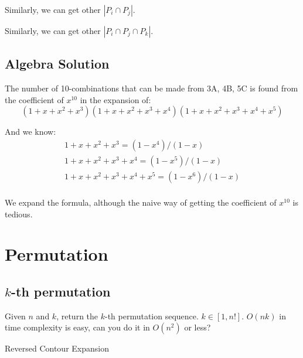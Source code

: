 Similarly, we can get other $|P_i \cap P_j|$.

Similarly, we can get other $|P_i \cap P_j \cap P_k|$.
\subsection{Algebra Solution}
The number of 10-combinations that can be made from 3A, 4B, 5C is found from the coefficient of $x^{10}$ in the expansion of:
$$
(1+x+x^2+x^3)(1+x+x^2+x^3+x^4)(1+x+x^2+x^3+x^4+x^5)
$$

And we know:
\begin{eqnarray*}
1+x+x^2+x^3         = (1-x^4)/(1-x)  \\
1+x+x^2+x^3+x^4     = (1-x^5)/(1-x)  \\
1+x+x^2+x^3+x^4+x^5 = (1-x^6)/(1-x)  \\
\end{eqnarray*}


We expand the formula, although the  naive way of getting the coefficient of $x^{10}$ is tedious. 

\section{Permutation}

\subsection{$k$-th permutation}
Given $n$ and $k$, return the $k$-th permutation sequence. $k\in [1, n!]$. $O(nk)$ in time complexity is easy, can you do it in $O(n^2)$ or less?

Reversed Contour Expansion

